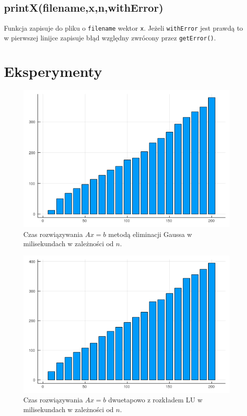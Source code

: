 \documentclass{article}
\begin{document}
\subsection{printX(filename,x,n,withError)}
Funkcja zapisuje do pliku o \verb|filename| wektor \verb|x|. Jeżeli \verb|withError| jest prawdą to w pierwszej linijce zapisuje błąd względny zwrócony przez \verb|getError()|.
\section{Eksperymenty}
\begin{figure}[H]
	\includegraphics[width=\linewidth]{n_elimination_noChoice.png}
	\caption{Czas rozwiązywania $Ax=b$ metodą eliminacji Gaussa w milisekundach w zależności od $n$.}
	\label{fig:asdf}
\end{figure}
\begin{figure}[H]
	\includegraphics[width=\linewidth]{n_withLU_noChoice.png}
	\caption{Czas rozwiązywania $Ax=b$ dwuetapowo z rozkładem LU w milisekundach w zależności od $n$.}
	\label{fig:asdf}
\end{figure}
\end{document}
